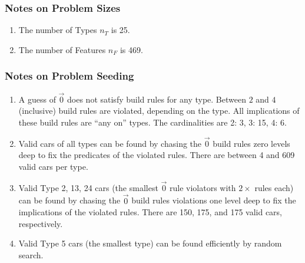 \documentclass[aps,prl,twocolumn,superscriptaddress,groupedaddress]{revtex4}  %
\begin{document}
\subsubsection{Notes on Problem Sizes}

\begin{enumerate}
\item The number of Types $n_{T}$ is 25.
\item The number of Features $n_{F}$ is 469. 
\end{enumerate}

\subsubsection{Notes on Problem Seeding}

\begin{enumerate}
\item A guess of $\vec 0$ does not satisfy build rules for any type. Between $2$
and $4$ (inclusive) build rules are violated, depending on the type. All
implications of these build rules are ``any on'' types. The cardinalities are 2:
3, 3: 15, 4: 6.
\item Valid cars of all types can be found by chasing the $\vec 0$ build rules
zero levels deep to fix the predicates of the violated rules. There are between
4 and 609 valid cars per type.
\item Valid Type 2, 13, 24 cars (the smallest $\vec 0$ rule violators with
$2\times$ rules each) can be found by chasing the $\vec 0$ build rules
violations one level deep to fix the implications of the violated rules. There
are 150, 175, and 175 valid cars, respectively.
\item Valid Type 5 cars (the smallest type) can be found efficiently by random
search.
\end{enumerate}


% 
% 
\end{document}
